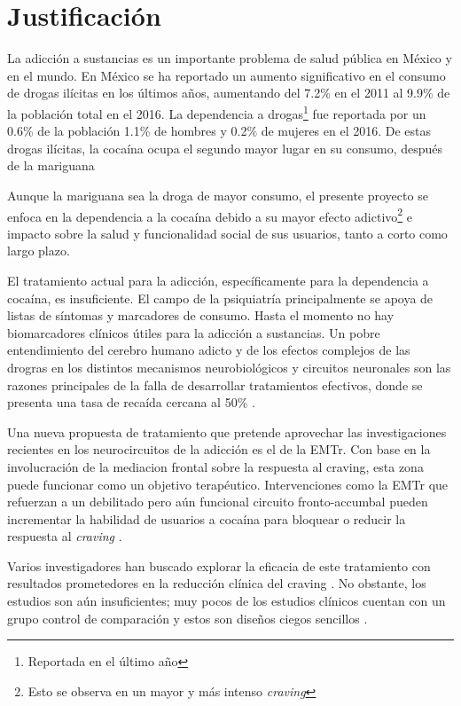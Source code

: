 \section{Justificación}
La adicción a sustancias es un importante problema de salud pública en México y en el mundo.
En México se ha reportado un aumento significativo en el consumo de drogas ilícitas en los últimos años, aumentando del 7.2\% en el 2011 al 9.9\% de la población total en el 2016.
La dependencia a drogas\footnote{Reportada en el último año} fue reportada por un 0.6\% de la población \textemdash{}1.1\% de hombres y 0.2\% de mujeres en el 2016.
De estas drogas ilícitas, la cocaína ocupa el segundo mayor lugar en su consumo, después de la mariguana \parencite{Villatoro-Velazques2017}\par
Aunque la mariguana sea la droga de mayor consumo, el presente proyecto se enfoca en la dependencia a la cocaína debido a su mayor efecto adictivo\footnote{Esto se observa en un mayor y más intenso \textit{craving}} e impacto sobre la salud y funcionalidad social de sus usuarios, tanto a corto como largo plazo. \par
El tratamiento actual para la adicción, específicamente para la dependencia a cocaína, es insuficiente.
El campo de la psiquiatría principalmente se apoya de listas de síntomas y marcadores de consumo.
Hasta el momento no hay biomarcadores clínicos útiles para la adicción a sustancias.
Un pobre entendimiento del cerebro humano adicto y de los efectos complejos de las drogras en los distintos mecanismos neurobiológicos y circuitos neuronales son las razones principales de la falla de desarrollar tratamientos efectivos, donde se presenta una tasa de recaída cercana al 50\% \parencite{McLellan2000a}. \par
Una nueva propuesta de tratamiento que pretende aprovechar las investigaciones recientes en los neurocircuitos de la adicción es el de la EMTr.
Con base en la involucración de la mediacion frontal sobre la respuesta al craving, esta zona puede funcionar como un objetivo terapéutico. Intervenciones como la EMTr que refuerzan a un debilitado pero aún funcional circuito fronto-accumbal pueden incrementar la habilidad de usuarios a cocaína para bloquear o reducir la respuesta al \textit{craving} \parencite{Volkow2010a}. \par
Varios investigadores han buscado explorar la eficacia de este tratamiento con resultados prometedores en la reducción clínica del craving \parencite{Rachid2018}.
No obstante, los estudios son aún insuficientes; muy pocos de los estudios clínicos cuentan con un grupo control de comparación y estos son diseños ciegos sencillos \parencite{Kearney-Ramos2018a, Kearney-Ramos2019, Terraneo2016,Hanlon2015}.
